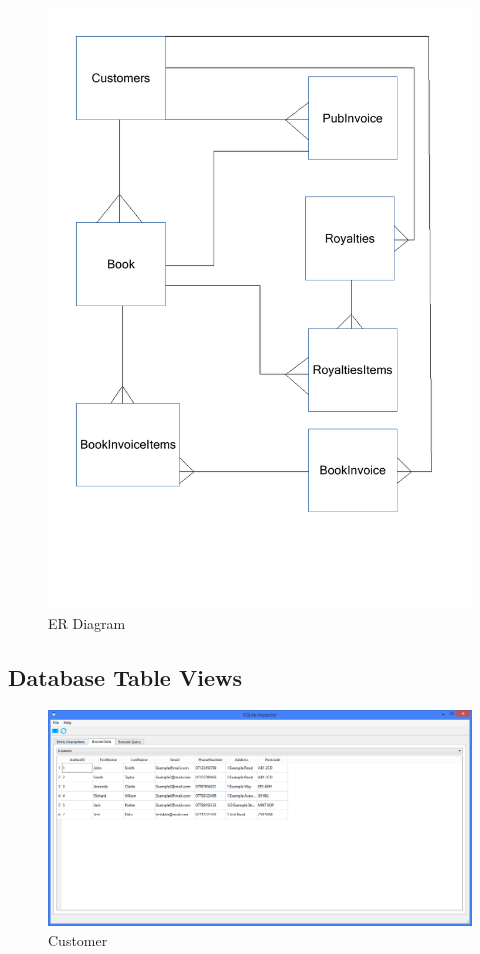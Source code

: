 \begin{figure}[H]
    \caption{ER Diagram} \label{ER_Diagram.pdf}
    \includegraphics[width=\textwidth]{./Design/ER_Diagram.pdf}
\end{figure}

\subsection{Database Table Views}

\begin{figure}[H]
    \caption{Customer} \label{fig:Customer}
    \includegraphics[width=\textwidth]{./Maintenance/DatabaseTables/Customer.png}
\end{figure}


